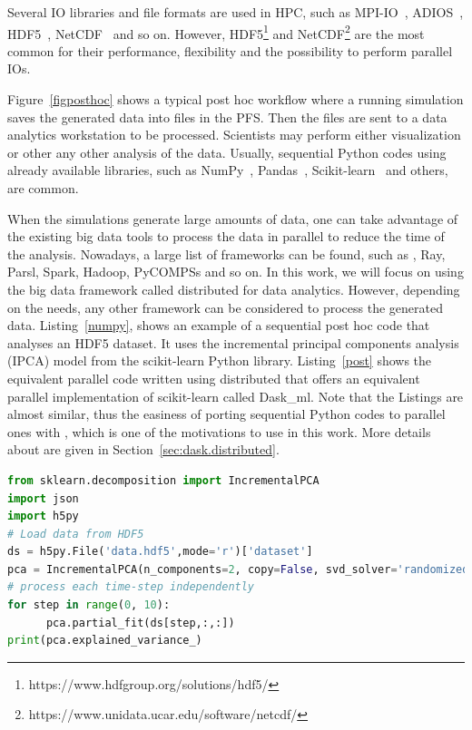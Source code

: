 Several IO libraries and file formats are used in HPC, such as MPI-IO~\cite{mpiio}, ADIOS~\cite{lofstead_insights_2013_adios, godoy_adios2_2020}, HDF5~\cite{Folk1999HDF5}, NetCDF~\cite{1592942_netcdf} and so on. However,  HDF5\footnote{https://www.hdfgroup.org/solutions/hdf5/} and NetCDF\footnote{https://www.unidata.ucar.edu/software/netcdf/} are the most common for their performance, flexibility and the possibility to perform parallel IOs. 
  
Figure~\ref{figposthoc} shows a typical post hoc workflow where a running simulation saves the generated data into files in the PFS. Then the files are sent to a data analytics workstation to be processed. 
Scientists may perform either visualization or other any other analysis of the data. Usually, sequential Python codes using already available libraries, such as NumPy~\cite{van2011numpy}, Pandas~\cite{mckinney2010data}, Scikit-learn~\cite{pedregosa2011scikit, kramer2016scikit} and others, are common. 

When the simulations generate large amounts of data, one can take advantage of the existing big data tools to process the data in parallel to reduce the time of the analysis. Nowadays, a large list of frameworks can be found, such as \dask, Ray, Parsl, Spark, Hadoop, PyCOMPSs and so on.   
In this work, we will focus on using the big data framework called \dask distributed for data analytics. However, depending on the needs, any other framework can be considered to process the generated data.
Listing~\ref{numpy}, shows an example of a sequential post hoc code that analyses an HDF5 dataset. It uses the incremental principal components analysis (IPCA) model from the scikit-learn Python library. Listing~\ref{post} shows the equivalent parallel code written using \dask distributed that offers an equivalent parallel implementation of scikit-learn called Dask\_ml. Note that the Listings are almost similar, thus the easiness of porting sequential Python codes to parallel ones with \dask, which is one of the motivations to use \dask in this work.   
More details about \dask are given in Section~\ref{sec:dask.distributed}.

\begin{lstlisting}[float, label=numpy, language=python, caption=Sequential post hoc data analysis with scikit-learn]
from sklearn.decomposition import IncrementalPCA
import json
import h5py
# Load data from HDF5
ds = h5py.File('data.hdf5',mode='r')['dataset']
pca = IncrementalPCA(n_components=2, copy=False, svd_solver='randomized')
# process each time-step independently
for step in range(0, 10):
      pca.partial_fit(ds[step,:,:])
print(pca.explained_variance_)
\end{lstlisting}

